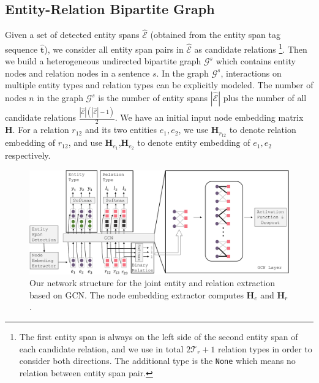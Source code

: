 \subsection{Entity-Relation Bipartite Graph} \label{section:ent-rel-graph}

Given a set of detected entity spans $\hat{\mathcal{E}}$
(obtained from the entity span tag sequence $\hat{\mathbf{t}}$),
we consider all entity span pairs in $\hat{\mathcal{E}}$ as candidate relations
\footnote{The first entity span is always on the left side of the second entity span of each candidate relation, and we use in total $2\mathcal{T}_r+1$ relation types in order to consider both directions.
The additional type is the \texttt{None}  which means no relation between entity span pair.}.
Then we build a heterogeneous undirected bipartite graph $\mathcal{G}^s$ which contains entity nodes and relation nodes in a sentence $s$.
In the graph $\mathcal{G}^s$, interactions  on  multiple  entity types and relation types can be explicitly modeled. 
The number of nodes $n$ in the graph $\mathcal{G}^s$ is the number of entity spans
$|\hat{{\mathcal{E}}}|$ plus the number of all candidate relations $\frac{|\hat{{\mathcal{E}}}| (|\hat{{\mathcal{E}}}| - 1)}{2}$.
We have an initial input node embedding matrix $\mathbf{H}$.
For a relation $r_{12}$ and its two entities $e_1, e_2$,
we use $\mathbf{H}_{r_{12}}$ to denote relation embedding of $r_{12}$,
and use
$\mathbf{H}_{e_1}$,$\mathbf{H}_{e_2}$ to denote entity embedding of $e_1, e_2$ respectively.


\begin{figure} 
    \begin{center}
        \includegraphics[width=6.0in]{../images/gcn.pdf}
    \end{center}
    \caption{Our network structure for the joint entity and relation extraction based on GCN. The node embedding extractor computes $\mathbf{H}_e$ and $\mathbf{H}_r$.}
    \label{fig:gcn}
\end{figure}



